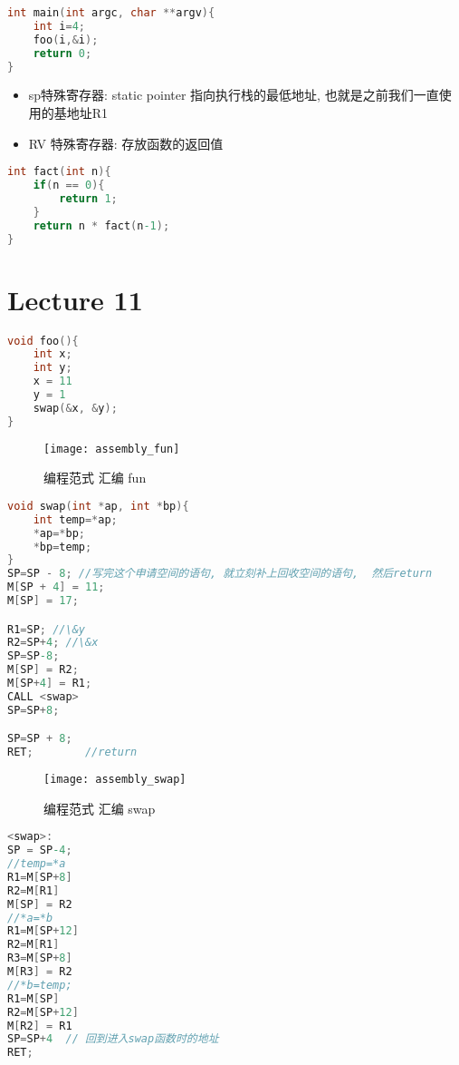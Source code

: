 \documentclass{article}
\begin{document}
\begin{lstlisting}[language = C]
int main(int argc, char **argv){
	int i=4;
	foo(i,&i);
	return 0;
}
\end{lstlisting}

\begin{itemize}
\item sp特殊寄存器: static pointer 指向执行栈的最低地址, 也就是之前我们一直使用的基地址R1
\item RV 特殊寄存器: 存放函数的返回值
\end{itemize}

\begin{lstlisting}[language = C]
int fact(int n){
	if(n == 0){
		return 1;
	}
	return n * fact(n-1);
}
\end{lstlisting}

\section{Lecture 11}
\begin{lstlisting}[language = C]
void foo(){
	int x;
	int y;
	x = 11
	y = 1
	swap(&x, &y);
}
\end{lstlisting}
\begin{figure}[htbp]
	\centering
	\texttt{[image: assembly\_fun]}\\
	\caption{编程范式 汇编 fun}\label{fig.assembly.fun}
\end{figure}


\begin{lstlisting}[language = C]
void swap(int *ap, int *bp){
	int temp=*ap;
	*ap=*bp;
	*bp=temp;
}
SP=SP - 8; //写完这个申请空间的语句, 就立刻补上回收空间的语句,  然后return
M[SP + 4] = 11;
M[SP] = 17;

R1=SP; //\&y
R2=SP+4; //\&x
SP=SP-8;
M[SP] = R2;
M[SP+4] = R1;
CALL <swap>
SP=SP+8;

SP=SP + 8;
RET;		//return
\end{lstlisting}

\begin{figure}[htbp]
	\centering
	\texttt{[image: assembly\_swap]}\\
	\caption{编程范式 汇编 swap}\label{fig.assembly.swap}
\end{figure}

\begin{lstlisting}[language = C]
<swap>:
SP = SP-4;
//temp=*a
R1=M[SP+8]
R2=M[R1]
M[SP] = R2
//*a=*b
R1=M[SP+12]
R2=M[R1]
R3=M[SP+8]
M[R3] = R2
//*b=temp;
R1=M[SP]
R2=M[SP+12]
M[R2] = R1
SP=SP+4  // 回到进入swap函数时的地址
RET;
\end{lstlisting}
\end{document}
